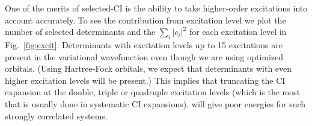 \documentclass[%
reprint,
 superscriptaddress,
 amsmath,amssymb,
 aps,
]{revtex4-1}
\begin{document}
One of the merits of selected-CI is the ability to take higher-order excitations into account accurately.
To see the contribution from excitation level we plot the number of selected determinants and the $\sum_i \left|c_i\right|^2$ for each excitation level in Fig.~\ref{fig:excit}.
Determinants with excitation levels up to 15 excitations are present in the variational wavefunction even though we are using optimized orbitals.
(Using Hartree-Fock orbitals, we expect that determinants with even higher excitation levels will be present.)
This implies that truncating the CI expansion at the double, triple or quadruple excitation levels (which is the most that is usually done in systematic
CI expansions), will give poor energies for such strongly correlated systems.



\end{document}
